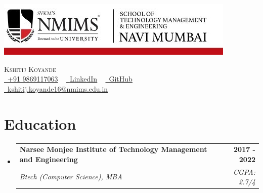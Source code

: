\documentclass[letterpaper,11pt]{article}
\makeatletter
\newcommand{\resumeSubheading}[4]{
  \vspace{-2pt}\item
    \begin{tabular*}{1.0\textwidth}[t]{l@{\extracolsep{\fill}}r}
      \textbf{#1} & \textbf{\small #2} \\
      \textit{\small#3} & \textit{\small #4} \\
    \end{tabular*}\vspace{-7pt}
}
\newcommand{\resumeSubHeadingListStart}{\begin{itemize}[leftmargin=0.0in, label={}]}
\newcommand{\resumeSubHeadingListEnd}{\end{itemize}}
\makeatother
\begin{document}
\begin{center}
\begin{minipage}{0.55\textwidth}
\includegraphics[scale=3]{nmims_logo.jpg}
\end{minipage}
\begin{minipage}{0.4\textwidth}
\raggedright
    {\huge \scshape Kshitij Koyande } \\ 
    \vspace{1pt}
   { 
    \href{tel:+919869117063}{\small \raisebox{-0.1\height}\faPhone\ \underline{+91 9869117063}} ~ 
    \href{https://www.linkedin.com/in/kshitij-koyande-a85aa2149}{\raisebox{-0.2\height}\faLinkedin\ \underline{LinkedIn}}  ~
    \href{https://github.com/gkKshitij}{\raisebox{-0.2\height}\faGithub\ \underline{GitHub}}\\
    \href{mailto:kshitij.koyande16@nmims.edu.in}{\raisebox{-0.2\height}\faEnvelope\  \underline{kshitij.koyande16@nmims.edu.in}}\\
    }
\end{minipage}
\vspace{4pt}

    \vspace{-8pt}
\end{center}


\section{Education}
  \resumeSubHeadingListStart
    \resumeSubheading
      {Narsee Monjee Institute of Technology Management and  Engineering}{2017 - 2022}
      {Btech (Computer Science), MBA}{CGPA: 2.7/4}
  \resumeSubHeadingListEnd

\end{document}
